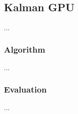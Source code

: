 \subsection{Kalman GPU}
\label{sec:link2d:kalman-gpu}

...

\subsubsection{Algorithm}

...

\subsubsection{Evaluation}

...

